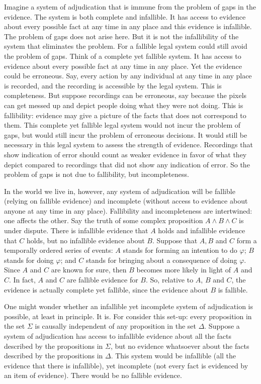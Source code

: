 \documentclass[
  10pt,
  dvipsnames,enabledeprecatedfontcommands]{scrartcl}
\begin{document}
Imagine a system of adjudication that is immune from the problem of gaps
in the evidence. The system is both complete and infallible. It has
access to evidence about every possible fact at any time in any place
and this evidence is infallible. The problem of gaps does not arise
here. But it is not the infallibility of the system that eliminates the
problem. For a fallible legal system could still avoid the problem of
gaps. Think of a complete yet fallible system. It has access to evidence
about every possible fact at any time in any place. Yet the evidence
could be erroneous. Say, every action by any individual at any time in
any place is recorded, and the recording is accessible by the legal
system. This is completeness. But suppose recordings can be erroneous,
say because the pixels can get messed up and depict people doing what
they were not doing. This is fallibility: evidence may give a picture of
the facts that does not correspond to them. This complete yet fallible
legal system would not incur the problem of gaps, but would still incur
the problem of erroneous decisions. It would still be necessary in this
legal system to assess the strength of evidence. Recordings that show
indication of error should count as weaker evidence in favor of what
they depict compared to recordings that did not show any indication of
error. So the problem of gaps is not due to fallibility, but
incompleteness.

In the world we live in, however, any system of adjudication will be
fallible (relying on fallible evidence) and incomplete (without access
to evidence about anyone at any time in any place). Fallibility and
incompleteness are intertwined: one affects the other. Say the truth of
some complex proposition \(A \wedge B \wedge C\) is under dispute. There
is infallible evidence that \(A\) holds and infallible evidence that
\(C\) holds, but no infallible evidence about \(B\). Suppose that
\(A, B\) and \(C\) form a temporally ordered series of events: \(A\)
stands for forming an intention to do \(\varphi\); \(B\) stands for
doing \(\varphi\); and \(C\) stands for bringing about a consequence of
doing \(\varphi\). Since \(A\) and \(C\) are known for sure, then \(B\)
becomes more likely in light of \(A\) and \(C\). In fact, \(A\) and
\(C\) are fallible evidence for \(B\). So, relative to \(A\), \(B\) and
\(C\), the evidence is actually complete yet fallible, since the
evidence about \(B\) is fallible.

One might wonder whether an infallible yet incomplete system of
adjudication is possible, at least in principle. It is. For consider
this set-up: every proposition in the set \(\Sigma\) is causally
independent of any proposition in the set \(\Delta\). Suppose a system
of adjudication has access to infallible evidence about all the facts
described by the propositions in \(\Sigma\), but no evidence whatsoever
about the facts described by the propositions in \(\Delta\). This system
would be infallible (all the evidence that there is infallible), yet
incomplete (not every fact is evidenced by an item of evidence). There
would be no fallible evidence.
\end{document}
